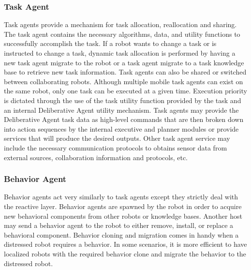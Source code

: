     \subsubsection{Task Agent}
      Task agents provide a mechanism for task allocation, reallocation and 
        sharing.
      The task agent contains the necessary algorithms, data, and utility
        functions to successfully accomplish the task.
      If a robot wants to change a task or is instructed to change a task, 
        dynamic task allocation is performed by having a new task agent migrate 
        to the robot or a task agent migrate to a task knowledge base to 
        retrieve new task information.
      Task agents can also be shared or switched between collaborating robots.
      Although multiple mobile task agents can exist on the same robot, only 
        one task can be executed at a given time.
      Execution priority is dictated through the use of the task utility 
        function provided by the task and an internal Deliberative Agent utility
        mechanism.
      Task agents may provide the Deliberative Agent task data as high-level 
        commands that are then broken down into action sequences by the internal 
        executive and planner modules or provide services that will produce the 
        desired outputs.
      Other task agent service may include the necessary communication protocols
        to obtains sensor data from external sources, collaboration information
        and protocols, etc.

    \subsubsection{Behavior Agent}
      Behavior agents act very similarly to task agents except they strictly 
        deal with the reactive layer.
      Behavior agents are spawned by the robot in order to acquire new 
        behavioral components from other robots or knowledge bases.
      Another host may send a behavior agent to the robot to either remove,
        install, or replace a behavioral component.
      Behavior cloning and migration comes in handy when a distressed robot 
        requires a behavior.
      In some scenarios, it is more efficient to have localized robots with the 
        required behavior clone and migrate the behavior to the distressed 
        robot.

